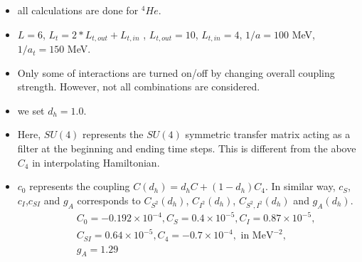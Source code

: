 \documentclass[10pt]{book}
\newcommand{\bea}{\begin{eqnarray}}
\newcommand{\eea}{\end{eqnarray}}
\newcommand{\no}{\nonumber \\}
\begin{document}
\begin{itemize}
\item all calculations are done for $^4He$.
\item $L=6$, $L_t=2*L_{t,out}+L_{t,in}$ , $L_{t,out}=10$, $L_{t,in}=4$,
      $1/a=100$ MeV, $1/a_t=150$ MeV.  
\item Only some of interactions
      are turned on/off by changing overall coupling strength.
      However, not all combinations are considered. 
\item we set $d_h=1.0$.             
\item Here, $SU(4)$ represents the $SU(4)$ symmetric transfer matrix acting 
       as a filter at the
       beginning and ending time steps. 
       This is different from the above $C_4$ in interpolating Hamiltonian.
\item $c_0$ represents the coupling $C(d_h)=d_hC+(1-d_h)C_4$. 
      In similar way, $c_S$, $c_I$,$c_{SI}$ and $g_A$ corresponds to
      $C_{S^2}(d_h)$, $C_{I^2}(d_h)$, $C_{S^2,I^2}(d_h)$ and $g_A(d_h)$.
      \bea 
      & &C_0=-0.192\times 10^{-4}, C_S=0.4\times 10^{-5}, C_I=0.87\times 10^{-5}, \no 
      & &C_{SI}=0.64\times 10^{-5}, C_4=-0.7\times 10^{-4}, \mbox{ in MeV}^{-2},\no 
      & & g_A=1.29
      \eea 
\end{itemize} 
\end{document}
